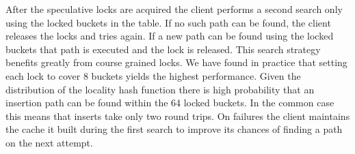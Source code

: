 After the speculative locks are acquired the client performs
a second search only using the locked buckets in the table.
If no such path can be found, the client releases the locks
and tries again. If a new path can be found using the locked
buckets that path is executed and the lock is released.
This search strategy benefits greatly from course grained
locks. We have found in practice that setting each lock to
cover 8 buckets yields the highest performance. Given the
distribution of the locality hash function there is high
probability that an insertion path can be found within the
64 locked buckets. In the common case this means that
inserts take only two round trips. On failures the client
maintains the cache it built during the first search to
improve its chances of finding a path on the next attempt.






